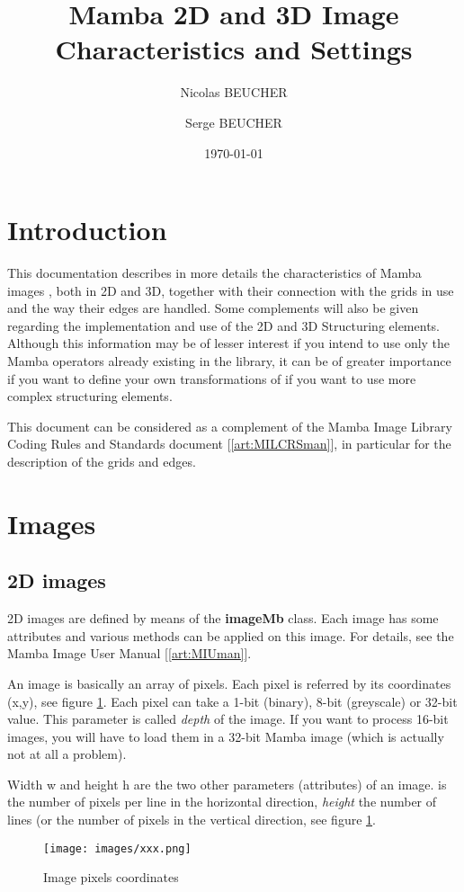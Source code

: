 \documentclass[a4paper,10pt,oneside]{article}
\title{Mamba 2D and 3D Image Characteristics and Settings}
\author{Nicolas BEUCHER \and Serge BEUCHER}
\date{\today}
\begin{document}
\mambaCover
\mambaContent
\mambaFigures

\section{Introduction}
This documentation describes in more details the characteristics of Mamba images , both in
2D and 3D, together with their connection with the grids in use and the way their edges are handled.
Some complements will also be given regarding the implementation and use of the  2D and 3D
Structuring elements. Although this information may be of lesser interest if you intend to use
only the Mamba operators already existing in the library, it can be of greater importance if you
want to define your own transformations of if you want to use more complex structuring elements.

This document can be considered as a complement of the Mamba Image Library Coding Rules and Standards
document [\ref{art:MILCRSman}], in particular for the description of the grids and edges.

\section{Images}
\subsection{2D images}
2D images are defined by means of the \textbf{imageMb} class. Each image has some attributes and
various methods can be applied on this image. For details, see the Mamba Image User Manual [\ref{art:MIUman}].

An image is basically an array of pixels. Each pixel is referred by its coordinates (x,y), see
figure \ref{fig:image_coord}. Each pixel can take a 1-bit (binary), 8-bit (greyscale) or 32-bit value.
This parameter is called \textit{depth} of the image. If you want to process 16-bit images, you will have to
load them in a 32-bit Mamba image (which is actually not at all a problem).

Width w and height h are the two other parameters (attributes) of an image.  is the number of
pixels per line in the horizontal direction, \textit{height} the number of lines (or the number of pixels in
the vertical direction, see figure \ref{fig:image_coord}.

\begin{figure}
\centering
\texttt{[image: images/xxx.png]}
\caption{Image pixels coordinates}
\label{fig:image_coord}
\end{figure}
\end{document}
